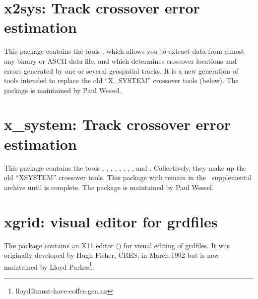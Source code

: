 \section{x2sys: Track crossover error estimation}

This package contains the tools ,
which allows you to extract data from almost any binary or ASCII
data file, and  which determines crossover
locations and errors generated by one or several geospatial tracks.
It is a new generation of tools intended to replace the old
``X\_SYSTEM'' crossover tools (below).  The package is maintained
by Paul Wessel.

\section{x\_system: Track crossover error estimation}

This package contains the tools ,
, , , ,
, , , and
.
Collectively, they make up the old ``XSYSTEM'' crossover tools.  This
package with remain in the \GMT\ supplemental archive until  is complete.
The package is maintained by Paul Wessel.

\section{xgrid: visual editor for grdfiles}

The package contains an X11 editor () for visual
editing of grdfiles.  It was originally developed by Hugh Fisher, CRES,
in March 1992 but is now maintained by Lloyd Parkes\footnote{lloyd@must-have-coffee.gen.nz}.
